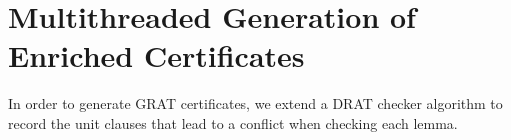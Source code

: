 \documentclass[smallcondensed]{svjour3}     %
\begin{document}
%     
%   
%   
%       
%       
%     
%     
    
\section{Multithreaded Generation of Enriched Certificates}\label{sec:gratgen}
In order to generate GRAT certificates, we extend a DRAT checker algorithm 
to record the unit clauses that lead to a conflict when checking each lemma. 
\end{document}
